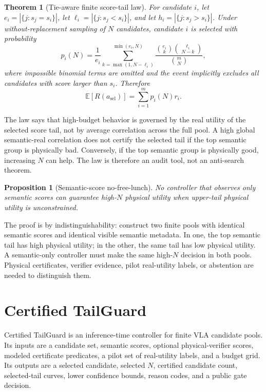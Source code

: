 \documentclass{article}
\newtheorem{theorem}{Theorem}
\newtheorem{proposition}{Proposition}
\newcommand{\method}{Certified TailGuard}
\newcommand{\util}{R}
\begin{document}
\begin{theorem}[Tie-aware finite score-tail law]
For candidate $i$, let $e_i = |\{j:s_j=s_i\}|$, let $\ell_i=|\{j:s_j<s_i\}|$, and let $h_i=|\{j:s_j>s_i\}|$. Under without-replacement sampling of $N$ candidates, candidate $i$ is selected with probability
\[
p_i(N)=\frac{1}{e_i}\sum_{k=\max(1,N-\ell_i)}^{\min(e_i,N)}
\frac{\binom{e_i}{k}\binom{\ell_i}{N-k}}{\binom{m}{N}},
\]
where impossible binomial terms are omitted and the event implicitly excludes all candidates with score larger than $s_i$. Therefore
\[
\mathbb{E}[\util(a_{\mathrm{sel}})] = \sum_{i=1}^{m} p_i(N)r_i .
\]
\end{theorem}

The law says that high-budget behavior is governed by the real utility of the selected score tail, not by average correlation across the full pool. A high global semantic-real correlation does not certify the selected tail if the top semantic group is physically bad. Conversely, if the top semantic group is physically good, increasing $N$ can help. The law is therefore an audit tool, not an anti-search theorem.

\begin{proposition}[Semantic-score no-free-lunch]
No controller that observes only semantic scores can guarantee high-$N$ physical utility when upper-tail physical utility is unconstrained.
\end{proposition}

The proof is by indistinguishability: construct two finite pools with identical semantic scores and identical visible semantic metadata. In one, the top semantic tail has high physical utility; in the other, the same tail has low physical utility. A semantic-only controller must make the same high-$N$ decision in both pools. Physical certificates, verifier evidence, pilot real-utility labels, or abstention are needed to distinguish them.

\section{Certified TailGuard}

\method{} is an inference-time controller for finite VLA candidate pools. Its inputs are a candidate set, semantic scores, optional physical-verifier scores, modeled certificate predicates, a pilot set of real-utility labels, and a budget grid. Its outputs are a selected candidate, selected $N$, certified candidate count, selected-tail curves, lower confidence bounds, reason codes, and a public gate decision.
\end{document}

